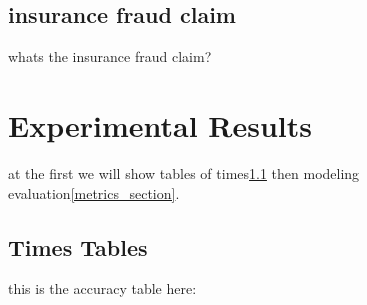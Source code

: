 \documentclass[preprint,12pt]{elsarticle}
\begin{document}
\subsection{insurance fraud claim}
\label{sec5_3}
whats the  insurance fraud claim?



\section{Experimental Results}
\label{sec6}

at the first we will show tables of times\ref{times_section} then modeling evaluation\ref{metrics_section}.

\subsection{Times Tables}\label{times_section}
this is the accuracy table here:
\end{document}
